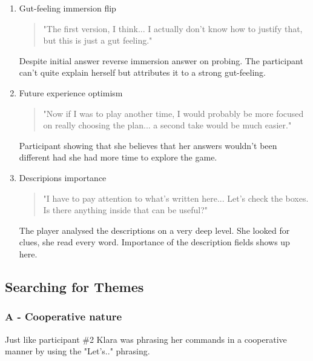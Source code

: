 \begin{enumerate}
        \begin{quote}
            "It's something new and it's cool to see something new... I think it would be even cooler if you could do more things." 
        \end{quote}
        Appreciation for the concept despite it's current limitations or stressors caused by it's form.


        \item Gut-feeling immersion flip
    
        \begin{quote}
            "The first version, I think... I actually don't know how to justify that, but this is just a gut feeling." 
        \end{quote}
        Despite initial answer reverse immersion answer on probing. The participant can't quite explain herself but attributes it to a strong gut-feeling.


        \item Future experience optimism
    
        \begin{quote}
            "Now if I was to play another time, I would probably be more focused on really choosing the plan... a second take would be much easier."
        \end{quote}
        Participant showing that she believes that her answers wouldn't been different had she had more time to explore the game. 


        \item Descripions importance
    
        \begin{quote}
            "I have to pay attention to what's written here... Let's check the boxes. Is there anything inside that can be useful?" 
        \end{quote}
        The player analysed the descriptions on a very deep level. She looked for clues, she read every word. Importance of the description fields shows up here.
         

\end{enumerate}


\subsection{Searching for Themes}

\subsubsection{A - Cooperative nature}
Just like participant \#2 Klara was phrasing her commands in a cooperative manner by using the "Let's.." phrasing. 



